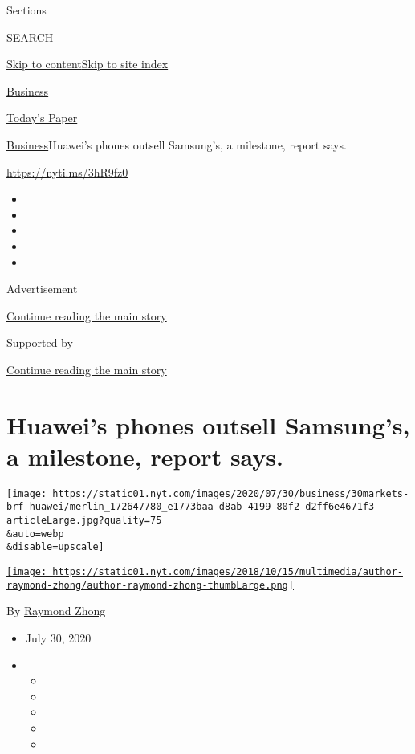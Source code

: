 Sections

SEARCH

\protect\hyperlink{site-content}{Skip to
content}\protect\hyperlink{site-index}{Skip to site index}

\href{https://www.nytimes.com/section/business}{Business}

\href{https://myaccount.nytimes.com/auth/login?response_type=cookie\&client_id=vi}{}

\href{https://www.nytimes.com/section/todayspaper}{Today's Paper}

\href{/section/business}{Business}\textbar{}Huawei's phones outsell
Samsung's, a milestone, report says.

\url{https://nyti.ms/3hR9fz0}

\begin{itemize}
\item
\item
\item
\item
\item
\end{itemize}

Advertisement

\protect\hyperlink{after-top}{Continue reading the main story}

Supported by

\protect\hyperlink{after-sponsor}{Continue reading the main story}

\hypertarget{huaweis-phones-outsell-samsungs-a-milestone-report-says}{%
\section{Huawei's phones outsell Samsung's, a milestone, report
says.}\label{huaweis-phones-outsell-samsungs-a-milestone-report-says}}

\texttt{[image: https://static01.nyt.com/images/2020/07/30/business/30markets-brf-huawei/merlin\_172647780\_e1773baa-d8ab-4199-80f2-d2ff6e4671f3-articleLarge.jpg?quality=75\\\&auto=webp\\\&disable=upscale]}

\href{https://www.nytimes.com/by/raymond-zhong}{\texttt{[image: https://static01.nyt.com/images/2018/10/15/multimedia/author-raymond-zhong/author-raymond-zhong-thumbLarge.png]}}

By \href{https://www.nytimes.com/by/raymond-zhong}{Raymond Zhong}

\begin{itemize}
\item
  July 30, 2020
\item
  \begin{itemize}
  \item
  \item
  \item
  \item
  \item
  \end{itemize}
\end{itemize}

